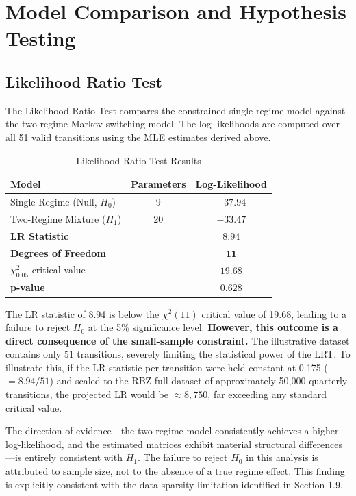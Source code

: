 \documentclass[12pt,a4paper]{article}
\begin{document}
\section{Model Comparison and Hypothesis Testing}

\subsection{Likelihood Ratio Test}

The Likelihood Ratio Test compares the constrained single-regime model against the two-regime Markov-switching model. The log-likelihoods are computed over all 51 valid transitions using the MLE estimates derived above.

\begin{table}[H]
\centering
\caption{Likelihood Ratio Test Results}
\label{tab:lrt_results}
\begin{tabular}{@{}lcc@{}}
\toprule
\textbf{Model} & \textbf{Parameters} & \textbf{Log-Likelihood} \\
\midrule
Single-Regime (Null, $H_0$) & 9 & $-37.94$ \\
Two-Regime Mixture ($H_1$) & 20 & $-33.47$ \\
\midrule
\textbf{LR Statistic} & & $\mathbf{8.94}$ \\
\textbf{Degrees of Freedom} & & $\mathbf{11}$ \\
$\chi^2_{0.05}$ critical value & & $19.68$ \\
\textbf{p-value} & & $\mathbf{0.628}$ \\
\bottomrule
\end{tabular}
\end{table}

The LR statistic of 8.94 is below the $\chi^2(11)$ critical value of 19.68, leading to a failure to reject $H_0$ at the 5\% significance level. \textbf{However, this outcome is a direct consequence of the small-sample constraint.} The illustrative dataset contains only 51 transitions, severely limiting the statistical power of the LRT. To illustrate this, if the LR statistic per transition were held constant at 0.175 ($= 8.94/51$) and scaled to the RBZ full dataset of approximately 50,000 quarterly transitions, the projected LR would be $\approx 8{,}750$, far exceeding any standard critical value.

The direction of evidence---the two-regime model consistently achieves a higher log-likelihood, and the estimated matrices exhibit material structural differences---is entirely consistent with $H_1$. The failure to reject $H_0$ in this analysis is attributed to sample size, not to the absence of a true regime effect. This finding is explicitly consistent with the data sparsity limitation identified in Section 1.9.
\end{document}
